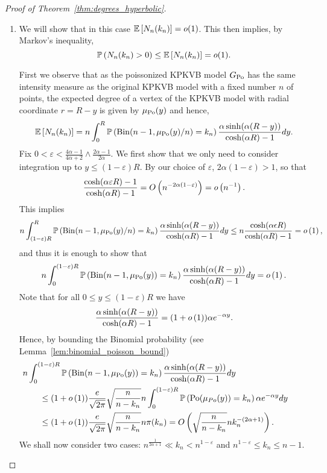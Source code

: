 \begin{proof}[Proof of Theorem~\ref{thm:degrees_hyperbolic}]
\begin{enumerate}[\upshape (i)]
Finally, since $k_n = \bigO{n^{\frac{1}{2\alpha+1}}}$, by Lemma~\ref{lem:diff_Nk_hyperbolic_binomial_poisson}, $\Exp{| N_n(k_n) - N_{Po}(k_n)|} = o(\Exp{N_{Po}(k_n)}) = o(\zeta)$, from which it follows that $\Prob{|N_n(k_n)-N_{Po}(k_n)|\geq 1} \leq \Exp{ |N_n(k_n)-N_{Po}(k_n)|} = o(\zeta)$. Hence, it also holds in the original KPKVB model that $N_n(k_n) \xrightarrow{d} Po(\zeta)$.

\item We will show that in this case $\mathbb{E}\left[N_n(k_n)\right] = o(1)$. This then implies, by Markov's inequality,
\[
	\mathbb{P}\left(N_n(k_n)>0\right)\leq \mathbb{E}\left[N_n(k_n)\right] = o(1).
\]

First we observe that as the poissonized KPKVB model $G_{{\mathrm{Po}}}$ has the same intensity measure as the original KPKVB model with a fixed number $n$ of points, the expected degree of a vertex of the KPKVB model with radial coordinate $r=R-y$ is given by $\mu_{{\mathrm{Po}}}(y)$ and hence,
\[
	\mathbb{E}\left[N_n(k_n)\right] = n \int_0^R \mathbb{P}\left(\mathrm{Bin}(n-1,\mu_{{\mathrm{Po}}}(y)/n) = k_n\right) 
	\frac{\alpha \sinh(\alpha (R-y))}{\cosh(\alpha R)-1} dy.
\]
Fix $0 < \varepsilon < \frac{4\alpha - 1}{4\alpha + 2} \wedge \frac{2\alpha - 1}{2\alpha}$. We first show that we only need to consider integration up to $y \le (1-\varepsilon)R$. By our choice of $\varepsilon$, $2\alpha(1-\varepsilon) > 1$, so that
\[
	\frac{\cosh(\alpha \varepsilon R) - 1}{\cosh(\alpha R) - 1}
	= O\left(n^{-2\alpha (1 - \varepsilon)}\right) = o\left(n^{-1}\right).
\]
This implies
\[
	n \int_{(1-\varepsilon)R}^R \mathbb{P}\left(\mathrm{Bin}(n-1,\mu_{{\mathrm{Po}}}(y)/n) = k_n\right)
	\frac{\alpha \sinh(\alpha (R-y))}{\cosh(\alpha R)-1} dy
	\le n \frac{\cosh(\alpha \epsilon R)}{\cosh(\alpha R)-1} = o\left(1\right),
\]
and thus it is enough to show that
\[
	n \int_0^{(1-\varepsilon)R} \mathbb{P}\left(\mathrm{Bin}(n-1,\mu_{{\mathrm{Po}}}(y)) = k_n\right)
	\frac{\alpha \sinh(\alpha (R-y))}{\cosh(\alpha R)-1} dy = o\left(1\right).
\]
Note that for all $0 \le y \le (1-\varepsilon)R$ we have
\[
	\frac{\alpha \sinh(\alpha (R-y))}{\cosh(\alpha R)-1} = (1+o\left(1\right)) \alpha e^{-\alpha y}.
\]
Hence, by bounding the Binomial probability (see Lemma~\ref{lem:binomial_poisson_bound})
\begin{align*}
	&\hspace{-20pt} n \int_0^{(1-\varepsilon)R} \Prob{\mathrm{Bin}(n-1,\mu_{\Po}(y)) = k_n}
		\frac{\alpha \sinh(\alpha (R-y))}{\cosh(\alpha R)-1} dy\\
	&\le (1+\smallO{1}) \frac{e}{\sqrt{2\pi}} \sqrt{\frac{n}{n-k_n}}
		n \int_0^{(1-\varepsilon)R} \Prob{\Po(\mu_{Po}(y)) = k_n} \alpha e^{-\alpha y} dy \\
	&\le (1+\smallO{1}) \frac{e}{\sqrt{2\pi}} \sqrt{\frac{n}{n-k_n}} n \pmf(k_n)
	= \bigO{\sqrt{\frac{n}{n-k_n}} n k_n^{-(2\alpha + 1)}}.
\end{align*}
We shall now consider two cases: $n^{\frac{1}{2\alpha + 1}} \ll k_n < n^{1-\varepsilon}$ and $n^{1-\varepsilon} \le k_n \le n - 1$.


\end{enumerate}
\end{proof}
